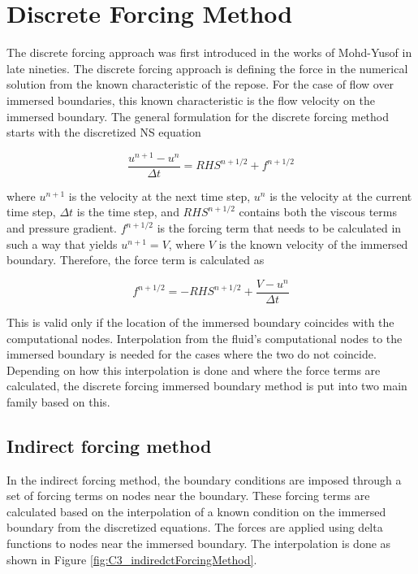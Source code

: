 \section{Discrete Forcing Method}
The discrete forcing approach was first introduced in the works of Mohd-Yusof \cite{mohd1997combined} in late nineties. The discrete forcing approach is defining the force in the numerical solution from the known characteristic of the repose. For the case of flow over immersed boundaries, this known characteristic is the flow velocity on the immersed boundary. The general formulation for the discrete forcing method starts with the discretized NS equation

\begin{equation}\label{eq:C3_discreteNSforIndirectForcing}
	\frac{u^{n+1} - u^n}{\Delta t} = RHS^{n+1/2} + f^{n+1/2}
\end{equation}

where $u^{n+1}$ is the velocity at the next time step, $u^n$ is the velocity at the current time step, $\Delta t$ is the time step, and $RHS^{n+1/2}$ contains both the viscous terms and pressure gradient. $f^{n+1/2}$ is the forcing term that needs to be calculated in such a way that yields $u^{n+1} = V$, where $V$ is the known velocity of the immersed boundary. Therefore, the force term is calculated as

\begin{equation}\label{eq:C3_indirectForceing}
	f^{n+1/2} = -RHS^{n+1/2} + \frac{V - u^n}{\Delta t}
\end{equation}

This is valid only if the location of the immersed boundary coincides with the computational nodes. Interpolation from the fluid's computational nodes to the immersed boundary is needed for the cases where the two do not coincide. Depending on how this interpolation is done and where the force terms are calculated, the discrete forcing immersed boundary method is put into two main family based on this.

\subsection{Indirect forcing method}
In the indirect forcing method, the boundary conditions are imposed through a set of forcing terms on nodes near the boundary. These forcing terms are calculated based on the interpolation of a known condition on the immersed boundary from the discretized equations. The forces are applied using delta functions to nodes near the immersed boundary. The interpolation is done as shown in Figure \ref{fig:C3_indiredctForcingMethod}.

